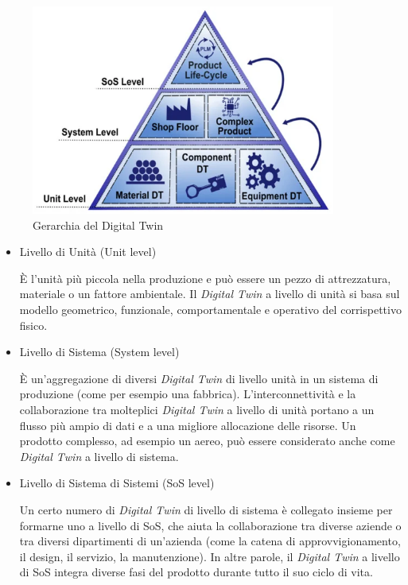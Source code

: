\begin{figure}[h]
\begin{center}                      
\includegraphics[width=10cm]{images/Gerarchia_DT.png}
\caption[Gerarchia del Digital Twin]{Gerarchia del Digital Twin}\label{fig:gerarchia}
\end{center}
\end{figure}

\begin{itemize}
    \item Livello di Unità (Unit level)
    
    È l'unità più piccola nella produzione e può essere un pezzo di attrezzatura, materiale o un fattore ambientale. Il \emph{Digital Twin} a livello di unità si basa sul modello geometrico, funzionale, comportamentale e operativo del corrispettivo fisico.

    \item Livello di Sistema (System level)
    
    È un'aggregazione di diversi \emph{Digital Twin} di livello unità in un sistema di produzione (come per esempio una fabbrica). L'interconnettività e la collaborazione tra molteplici \emph{Digital Twin} a livello di unità portano a un flusso più ampio di dati e a una migliore allocazione delle risorse. Un prodotto complesso, ad esempio un aereo, può essere considerato anche come \emph{Digital Twin} a livello di sistema.

    \item Livello di Sistema di Sistemi (SoS level)
    
    Un certo numero di \emph{Digital Twin} di livello di sistema è collegato insieme per formarne uno a livello di SoS, che aiuta la collaborazione tra diverse aziende o tra diversi dipartimenti di un'azienda (come la catena di approvvigionamento, il design, il servizio, la manutenzione). In altre parole, il \emph{Digital Twin} a livello di SoS integra diverse fasi del prodotto durante tutto il suo ciclo di vita.

\end{itemize}

